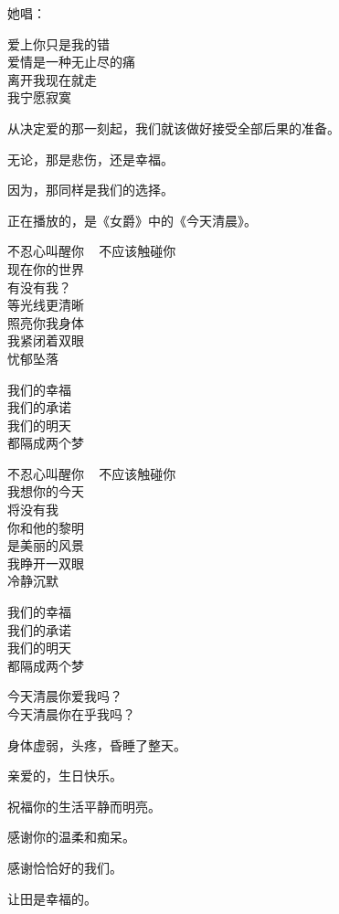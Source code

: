 		她唱：

		\longpoem{}{}{}
			爱上你只是我的错 \\
			爱情是一种无止尽的痛 \\
			离开我现在就走 \\
			我宁愿寂寞
		\endlongpoem

		从决定爱的那一刻起，我们就该做好接受全部后果的准备。\par
		无论，那是悲伤，还是幸福。\par
		因为，那同样是我们的选择。

		正在播放的，是《女爵》中的《今天清晨》。

		\longpoem{}{}{}
			不忍心叫醒你 ~ 不应该触碰你 \\
			现在你的世界 \\
			有没有我？\\
			等光线更清晰 \\
			照亮你我身体 \\
			我紧闭着双眼 \\
			忧郁坠落

			我们的幸福 \\
			我们的承诺 \\
			我们的明天 \\
			都隔成两个梦

			不忍心叫醒你 ~ 不应该触碰你 \\
			我想你的今天 \\
			将没有我 \\
			你和他的黎明 \\
			是美丽的风景 \\
			我睁开一双眼 \\
			冷静沉默

			我们的幸福 \\
			我们的承诺 \\
			我们的明天 \\
			都隔成两个梦

			今天清晨你爱我吗？\\
			今天清晨你在乎我吗？
		\endlongpoem

		身体虚弱，头疼，昏睡了整天。

	\endwriting



		亲爱的，生日快乐。\par
		祝福你的生活平静而明亮。

		\vspace{1em}
		感谢你的温柔和痴呆。\par
		感谢恰恰好的我们。\par
		让田是幸福的。

